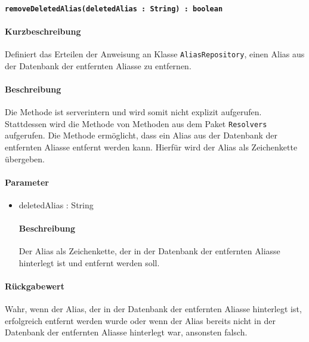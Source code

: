 \paragraph*{\texttt{removeDeletedAlias(deletedAlias : String) : boolean}}%
\paragraph*{Kurzbeschreibung}
Definiert das Erteilen der Anweisung an Klasse \texttt{AliasRepository}, einen Alias aus der Datenbank der entfernten Aliasse zu entfernen.
\paragraph*{Beschreibung}
Die Methode ist serverintern und wird somit nicht explizit aufgerufen.
Stattdessen wird die Methode von Methoden aus dem Paket \texttt{Resolvers} aufgerufen.
Die Methode ermöglicht, dass ein Alias aus der Datenbank der entfernten Aliasse entfernt werden kann.
Hierfür wird der Alias als Zeichenkette übergeben.
\paragraph*{Parameter}
\begin{itemize}
    \item deletedAlias : String
    		\paragraph*{Beschreibung}
    		Der Alias als Zeichenkette, der in der Datenbank der entfernten Aliasse hinterlegt ist und entfernt werden soll.
\end{itemize}
\paragraph*{Rückgabewert}
Wahr, wenn der Alias, der in der Datenbank der entfernten Aliasse hinterlegt ist, erfolgreich entfernt werden wurde oder wenn der Alias bereits nicht in der Datenbank der entfernten Aliasse hinterlegt war, ansonsten falsch.
